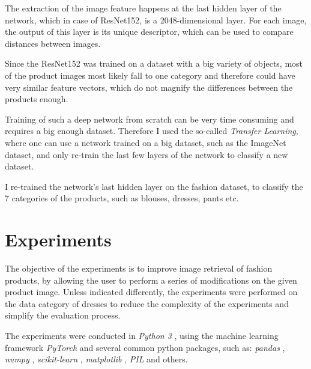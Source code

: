 \documentclass[12pt]{report}
\begin{document}
The extraction of the image feature happens at the last hidden layer of the network, which in case of ResNet152, is a 2048-dimensional layer. For each image, the output of this layer is its unique descriptor, which can be used to compare distances between images.

Since the ResNet152 was trained on a dataset with a big variety of objects, most of the product images most likely fall to one category and therefore could have very similar feature vectors, which do not magnify the differences between the products enough.

Training of such a deep network from scratch can be very time consuming and requires a big enough dataset. Therefore I used the so-called \textit{Transfer Learning}, where one can use a network trained on a big dataset, such as the ImageNet dataset, and only re-train the last few layers of the network to classify a new dataset.

I re-trained the network's last hidden layer on the fashion dataset, to classify the 7 categories of the products, such as blouses, dresses, pants etc. 


\pagebreak
\chapter{Experiments}
The objective of the experiments is to improve image retrieval of fashion products, by allowing the user to perform a series of modifications on the given product image. Unless indicated differently, the experiments were performed on the data category of dresses to reduce the complexity of the experiments and simplify the evaluation process.

The experiments were conducted in \textit{Python 3} \cite{noauthor_welcome_nodate}, using the machine learning framework \textit{PyTorch} \cite{noauthor_pytorch_nodate} and several common python packages, such as: \textit{pandas} \cite{noauthor_python_nodate}, \textit{numpy} \cite{noauthor_numpy_nodate}, \textit{scikit-learn} \cite{noauthor_scikit-learn_nodate}, \textit{matplotlib} \cite{noauthor_matplotlib_nodate}, \textit{PIL} \cite{noauthor_pillow_nodate} and others. 



\pagebreak
\end{document}
